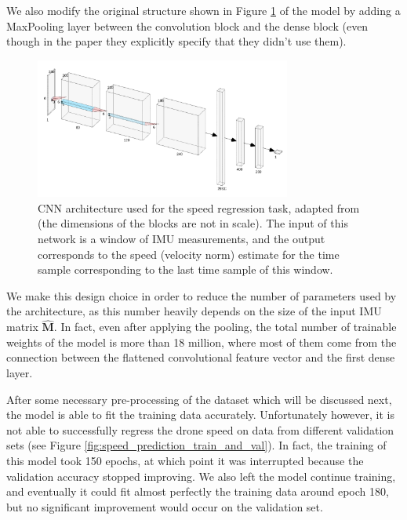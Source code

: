 We also modify the original structure shown in Figure \ref{fig:speed_net} of the model by adding a MaxPooling layer between the convolution block and the dense block (even though in the paper they explicitly specify that they didn't use them).
\begin{figure}[h]
   \centering
   \includegraphics[width=0.75\textwidth]{img/speed_net.png}
   \caption{CNN architecture used for the speed regression task, adapted from \cite{DBLP:journals/corr/abs-1802-02209} (the dimensions of the blocks are not in scale).
   The input of this network is a window of IMU measurements, and the output corresponds to the speed (velocity norm) estimate for the time sample corresponding to the last time sample of this window.}
   \label{fig:speed_net}
\end{figure}

We make this design choice in order to reduce the number of parameters used by the architecture, as this number heavily depends on the size of the input IMU matrix $\mathbf{\hat{M}}$.
In fact, even after applying the pooling, the total number of trainable weights of the model is more than 18 million, where most of them come from the connection between the flattened convolutional feature vector and the first dense layer.

After some necessary pre-processing of the dataset which will be discussed next, the model is able to fit the training data accurately.
Unfortunately however, it is not able to successfully regress the drone speed on data from different validation sets (see Figure \ref{fig:speed_prediction_train_and_val}).
In fact, the training of this model took 150 epochs, at which point it was interrupted because the validation accuracy stopped improving.
We also left the model continue training, and eventually it could fit almost perfectly the training data around epoch 180, but no significant improvement would occur on the validation set.


